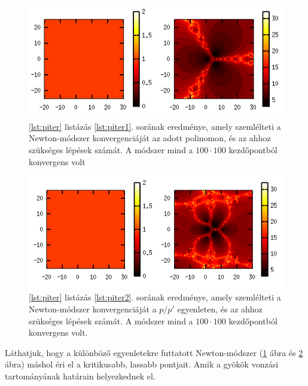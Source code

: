 \documentclass[a4paper,12pt]{report}
\begin{document}
				\begin{figure}[ht]
					\centering
					\includegraphics[scale=0.7]{p-iter1.png}
					\caption{\ref{lst:piter} listázás \ref{lst:piter1}. sorának eredménye, amely szemlélteti a Newton-módszer konvergenciáját az adott polinomon, és az ahhoz szükséges lépések számát. A módszer mind a $100\cdot 100$ kezdőpontból konvergens volt} \label{fig:piter1}
				\end{figure}
				
				\begin{figure}[ht]
					\centering
					\includegraphics[scale=0.7]{p-iter2.png}
					\caption{\ref{lst:piter} listázás \ref{lst:piter2}. sorának eredménye, amely szemlélteti a Newton-módszer konvergenciáját a $p/p'$ egyenleten, és az ahhoz szükséges lépések számát. A módszer mind a $100\cdot 100$ kezdőpontból konvergens volt.} \label{fig:piter2}
				\end{figure}
				
				Láthatjuk, hogy a különböző egyenletekre futtatott Newton-módszer (\ref{fig:piter1} ábra és \ref{fig:piter2} ábra) máshol éri el a kritikusabb, lassabb pontjait. Amik a gyökök vonzási tartományának határain helyezkednek el.
				
\end{document}
